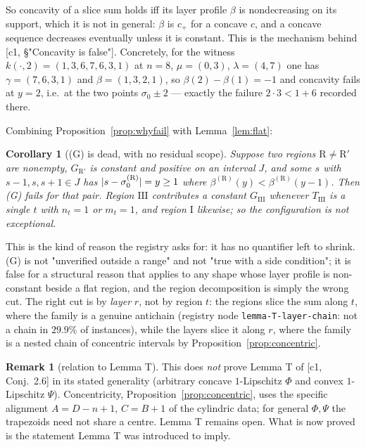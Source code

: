 \documentclass[11pt]{article}
\newtheorem{corollary}[theorem]{Corollary}
\theoremstyle{definition}
\newtheorem{remark}[theorem]{Remark}
\DeclarePairedDelimiter{\abs}{\lvert}{\rvert}
\begin{document}
So concavity of a slice sum holds iff its layer profile $\beta$ is nondecreasing on its
support, which it is not in general: $\beta$ is $c_+$ for a concave $c$, and a concave
sequence decreases eventually unless it is constant. This is the mechanism behind
[c1, §"Concavity is false"]. Concretely, for the witness $k(\cdot,2)=(1,3,6,7,6,3,1)$ at
$n=8$, $\mu=(0,3)$, $\lambda=(4,7)$ one has $\gamma=(7,6,3,1)$ and
$\beta=(1,3,2,1)$, so $\beta(2)-\beta(1)=-1$ and concavity fails at $y=2$, i.e.\ at the two
points $\sigma_0\pm2$ --- exactly the failure $2\cdot3<1+6$ recorded there.

Combining Proposition~\ref{prop:whyfail} with Lemma~\ref{lem:flat}:

\begin{corollary}[(G) is dead, with no residual scope]\label{cor:dead}
Suppose two regions $\mathrm R\ne\mathrm R'$ are nonempty, $G_{\mathrm R'}$ is constant and
positive on an interval $J$, and some $s$ with $s-1,s,s+1\in J$ has
$\abs{s-\sigma_0^{(\mathrm R)}}=y\ge1$ where $\beta^{(\mathrm R)}(y)<\beta^{(\mathrm R)}(y-1)$.
Then \textup{(G)} fails for that pair. Region $\mathrm{III}$ contributes a constant
$G_{\mathrm{III}}$ whenever $T_{\mathrm{III}}$ is a single $t$ with $n_t=1$ or $m_t=1$,
and region $\mathrm I$ likewise; so the configuration is not exceptional.
\end{corollary}

This is the kind of reason the registry asks for: it has no quantifier left to shrink. (G)
is not "unverified outside a range" and not "true with a side condition"; it is false for a
structural reason that applies to any shape whose layer profile is non-constant beside a
flat region, and the region decomposition is simply the wrong cut. The right cut is by
\emph{layer} $r$, not by region $t$: the regions slice the sum along $t$, where the family
is a genuine antichain (registry node \texttt{lemma-T-layer-chain}:
not a chain in $29.9\%$ of instances), while the layers slice it along $r$, where the
family is a nested chain of concentric intervals by Proposition~\ref{prop:concentric}.

\begin{remark}[relation to Lemma T]
This does \emph{not} prove Lemma T of [c1, Conj.~2.6] in its stated generality
(arbitrary concave $1$-Lipschitz $\Phi$ and convex $1$-Lipschitz $\Psi$). Concentricity,
Proposition~\ref{prop:concentric}, uses the specific alignment $A=D-n+1$, $C=B+1$ of the
cylindric data; for general $\Phi,\Psi$ the trapezoids need not share a centre. Lemma T
remains open. What is now proved is the statement Lemma T was introduced to imply.
\end{remark}
\end{document}
